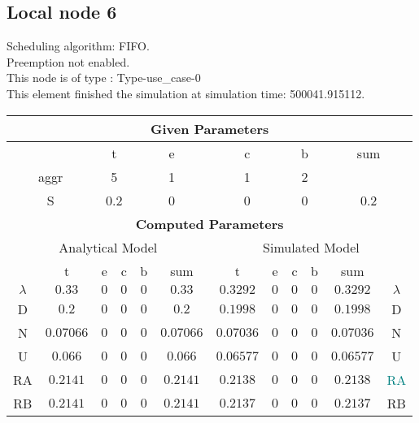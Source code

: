 \documentclass{article}
\begin{document}
\subsection{Local node 6}
Scheduling algorithm: FIFO.\\Preemption not enabled. \\This node is of type : Type-use\_case-0\\
This element finished the simulation at simulation time: 500041.915112.\\
\begin{table}[H]\centering\begin{tabular}{@{}c|cccc|c||cccc|c|c@{}}\toprule\multicolumn{12}{c}{\textbf{Given Parameters}}\\\midrule\multicolumn{2}{c|}{ } & \multicolumn{2}{c}{t} & \multicolumn{2}{c}{e} & \multicolumn{2}{c}{c} & \multicolumn{2}{c}{b} & \multicolumn{2}{|c}{sum} \\\midrule\multicolumn{2}{c|}{aggr} & \multicolumn{2}{c}{5} & \multicolumn{2}{c}{1} & \multicolumn{2}{c}{1} & \multicolumn{2}{c}{2} & \multicolumn{2}{|c}{ } \\ \midrule\multicolumn{2}{c|}{S} & \multicolumn{2}{c}{0.2} & \multicolumn{2}{c}{0} & \multicolumn{2}{c}{0} & \multicolumn{2}{c}{0} & \multicolumn{2}{|c}{0.2}\\ \midrule\midrule\multicolumn{12}{c}{\textbf{Computed Parameters}}\\ \midrule\multicolumn{6}{c||}{Analytical Model} & \multicolumn{6}{c}{Simulated Model}\\ 
 \midrule & t & e & c & b & sum & t & e & c & b & sum &  \\ \midrule$\lambda$ &$0.33$ & $0$ & $0$ & $0$ & $0.33$ & $0.3292$ & $0$ & $0$ & $0$ & $0.3292$& $\lambda$ \\D & $0.2$ & $0$ & $0$ & $0$ & $0.2$ & $0.1998$ & $0$ & $0$ & $0$ & $0.1998$& D\\N & $0.07066$ & $0$ & $0$ & $0$ & $0.07066$ & $0.07036$ & $0$ & $0$ & $0$ & $0.07036$& N\\U & $0.066$ & $0$ & $0$ & $0$ & $0.066$ & $0.06577$ & $0$ & $0$ & $0$ & $0.06577$& U\\RA & $0.2141$ & $0$ & $0$ & $0$ & $0.2141$ & $0.2138$ & $0$ & $0$ & $0$ & $0.2138$& \textcolor{teal}{RA}\\RB & $0.2141$ & $0$ & $0$ & $0$ & $0.2141$ & $0.2137$ & $0$ & $0$ & $0$ & $0.2137$& RB\\
\bottomrule
\end{tabular}
\end{table}
\filbreak
\end{document}
